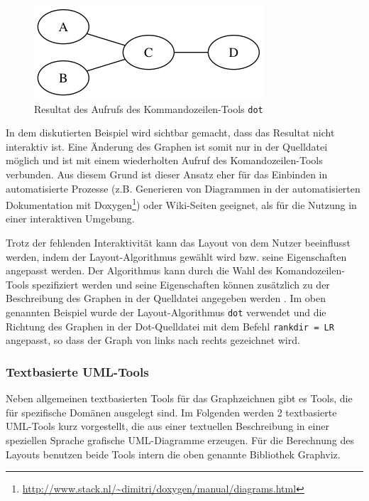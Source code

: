 \begin{figure}[hbt]
    \centering
    \includegraphics[scale=0.75]{resources/graphviz-dot-example.png}
    \caption{Resultat des Aufrufs des Kommandozeilen-Tools \lstinline{dot}}
    \label{fig:graphviz-dot-example}
\end{figure}

In dem diskutierten Beispiel wird sichtbar gemacht, dass das Resultat nicht interaktiv ist. Eine Änderung des Graphen ist somit nur in der Quelldatei möglich und ist mit einem wiederholten Aufruf des Komandozeilen-Tools verbunden. Aus diesem Grund ist dieser Ansatz eher für das Einbinden in automatisierte Prozesse (z.B. Generieren von Diagrammen in der automatisierten Dokumentation mit Doxygen\footnote{\url{http://www.stack.nl/~dimitri/doxygen/manual/diagrams.html}}) oder Wiki-Seiten geeignet, als für die Nutzung in einer interaktiven Umgebung.

Trotz der fehlenden Interaktivität kann das Layout von dem Nutzer beeinflusst werden, indem der Layout-Algorithmus gewählt wird bzw. seine Eigenschaften angepasst werden. Der Algorithmus kann durch die Wahl des Komandozeilen-Tools spezifiziert werden und seine Eigenschaften können zusätzlich zu der Beschreibung des Graphen in der Quelldatei angegeben werden \cite{NorthGansner14Dot-Manual}. Im oben genannten Beispiel wurde der Layout-Algorithmus \lstinline{dot} verwendet und die Richtung des Graphen in der Dot-Quelldatei mit dem Befehl \lstinline{rankdir = LR} angepasst, so dass der Graph von links nach rechts gezeichnet wird.

\subsubsection{Textbasierte UML-Tools}

Neben allgemeinen textbasierten Tools für das Graphzeichnen gibt es Tools, die für spezifische Domänen ausgelegt sind. Im Folgenden werden 2 textbasierte UML-Tools kurz vorgestellt, die aus einer textuellen Beschreibung in einer speziellen Sprache grafische UML-Diagramme erzeugen. Für die Berechnung des Layouts benutzen beide Tools intern die oben genannte Bibliothek Graphviz.

